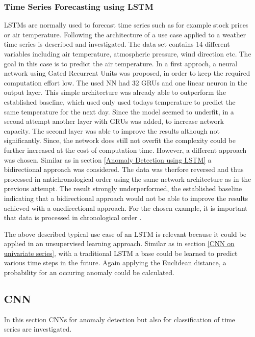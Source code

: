 \subsubsection{Time Series Forecasting using LSTM}
LSTMs are normally used to forecast time series such as for example stock prices or air temperature. Following the architecture of a use case applied to a weather time series is described and investigated. The data set contains 14 different variables including air temperature, atmospheric pressure, wind direction etc. The goal in this case is to predict the air temperature. In a first approch, a neural network using Gated Recurrent Units was proposed, in order to keep the required computation effort low. The used NN had 32 GRUs and one linear neuron in the output layer. This simple architecture was already able to outperform the established baseline, which used only used todays temperature to predict the same temperature for the next day. Since the model seemed to underfit, in a second attempt another layer with GRUs was added, to increase network capacity. The second layer was able to improve the results although not significantly. Since, the network does still not overfit the complexity could be further increased at the cost of computation time. However, a different approach was chosen. Similar as in section \ref{Anomaly Detection using LSTM} a bidirectional approach was considered. The data was therfore reversed and thus processed in antichronological order using the same network architecture as in the previous attempt. The result strongly underperformed, the established baseline indicating that a bidirectional approach would not be able to improve the results achieved with a onedirectional approach. For the chosen example, it is important that data is processed in chronological order \parencite{Chollet2018}. 

The above described typical use case of an LSTM is relevant because it could be applied in an unsupervised learning approach. Similar as in section \ref{CNN on univariate series}, with a traditional LSTM a base could be learned to predict various time steps in the future. Again applying the Euclidean distance, a probability for an occuring anomaly could be calculated.

\subsection{CNN}
In this section CNNs for anomaly detection but also for classification of time series are investigated. 

